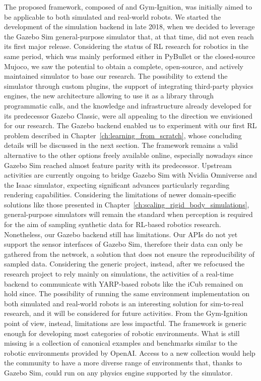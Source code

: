 The proposed framework, composed of \scenario and Gym-Ignition, was initially aimed to be applicable to both simulated and real-world robots.
We started the development of the simulation backend in late 2018, when we decided to leverage the Gazebo Sim general-purpose simulator that, at that time, did not even reach its first major release.
Considering the status of \ac{RL} research for robotics in the same period, which was mainly performed either in PyBullet or the closed-source Mujoco, we saw the potential to obtain a complete, open-source, and actively maintained simulator to base our research.
The possibility to extend the simulator through custom plugins, the support of integrating third-party physics engines, the new architecture allowing to use it as a library through programmatic calls, and the knowledge and infrastructure already developed for its predecessor Gazebo Classic, were all appealing to the direction we envisioned for our research.
The Gazebo \scenario backend enabled us to experiment with our first \ac{RL} problem described in Chapter~\ref{ch:learning_from_scratch}, whose concluding details will be discussed in the next section.
The framework remains a valid alternative to the other options freely available online, especially nowadays since Gazebo Sim reached almost feature parity with its predecessor.
Upstream activities are currently ongoing to bridge Gazebo Sim with Nvidia Omniverse and the Isaac simulator, expecting significant advances particularly regarding rendering capabilities.
Considering the limitations of newer domain-specific solutions like those presented in Chapter~\ref{ch:scaling_rigid_body_simulations}, general-purpose simulators will remain the standard when perception is required for the aim of sampling synthetic data for \ac{RL}-based robotics research.
Nonetheless, our Gazebo \scenario backend still has limitations.
Our \acp{API} do not yet support the sensor interfaces of Gazebo Sim, therefore their data can only be gathered from the network, a solution that does not ensure the reproducibility of sampled data.
Considering the generic \scenario project, instead, after we refocused the research project to rely mainly on simulations, the activities of a real-time backend to communicate with YARP-based robots like the iCub remained on hold since.
The possibility of running the same environment implementation on both simulated and real-world robots is an interesting solution for sim-to-real research, and it will be considered for future activities.
From the Gym-Ignition point of view, instead, limitations are less impactful.
The framework is generic enough for developing most categories of robotic environments.
What is still missing is a collection of canonical examples and benchmarks similar to the robotic environments provided by OpenAI.
Access to a new collection would help the community to have a more diverse range of environments that, thanks to Gazebo Sim, could run on any physics engine supported by the simulator.

